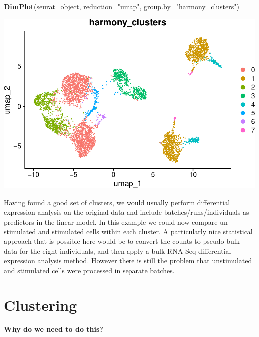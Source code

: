 \documentclass[
]{book}
\newenvironment{Shaded}{\begin{snugshade}}{\end{snugshade}}
\newcommand{\AttributeTok}[1]{\textcolor[rgb]{0.13,0.29,0.53}{#1}}
\newcommand{\FunctionTok}[1]{\textcolor[rgb]{0.13,0.29,0.53}{\textbf{#1}}}
\newcommand{\NormalTok}[1]{#1}
\newcommand{\StringTok}[1]{\textcolor[rgb]{0.31,0.60,0.02}{#1}}
\begin{document}
\begin{Shaded}
\begin{Highlighting}[]
\FunctionTok{DimPlot}\NormalTok{(seurat\_object, }\AttributeTok{reduction=}\StringTok{"umap"}\NormalTok{, }\AttributeTok{group.by=}\StringTok{"harmony\_clusters"}\NormalTok{)}
\end{Highlighting}
\end{Shaded}

\includegraphics{scRNAseqInR_ABACBS_2024_Doco_files/figure-latex/harmony4-3.pdf}

Having found a good set of clusters, we would usually perform differential expression analysis on the original data and include batches/runs/individuals as predictors in the linear model. In this example we could now compare un-stimulated and stimulated cells within each cluster. A particularly nice statistical approach that is possible here would be to convert the counts to pseudo-bulk data for the eight individuals, and then apply a bulk RNA-Seq differential expression analysis method. However there is still the problem that unstimulated and stimulated cells were processed in separate batches.

\hypertarget{clustering}{%
\chapter{Clustering}\label{clustering}}

\hypertarget{why-do-we-need-to-do-this-6}{%
\subsubsection*{Why do we need to do this?}\label{why-do-we-need-to-do-this-6}}
\end{document}
